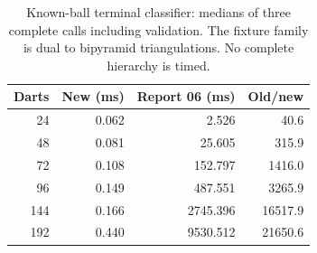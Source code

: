 \begin{table}[htbp]
\centering\small
\setlength{\tabcolsep}{4pt}
\begin{tabular}{rrrr}
\toprule
Darts & New (ms) & Report 06 (ms) & Old/new \\
\midrule
24 & 0.062 & 2.526 & 40.6 \\
48 & 0.081 & 25.605 & 315.9 \\
72 & 0.108 & 152.797 & 1416.0 \\
96 & 0.149 & 487.551 & 3265.9 \\
144 & 0.166 & 2745.396 & 16517.9 \\
192 & 0.440 & 9530.512 & 21650.6 \\
\bottomrule
\end{tabular}
\caption{Known-ball terminal classifier: medians of three complete calls including validation. The fixture family is dual to bipyramid triangulations. No complete hierarchy is timed.}
\label{tab:terminal-times}
\end{table}
